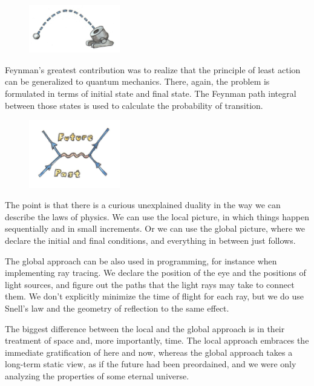 \begin{figure}[H]
\centering
\includegraphics[width=1.56250in]{images/mortar.jpg}
\end{figure}

\noindent
Feynman's greatest contribution was to realize that the principle of
least action can be generalized to quantum mechanics. There, again, the
problem is formulated in terms of initial state and final state. The
Feynman path integral between those states is used to calculate the
probability of transition.

\begin{figure}[H]
\centering
\includegraphics[width=1.56250in]{images/feynman.jpg}
\end{figure}

\noindent
The point is that there is a curious unexplained duality in the way we
can describe the laws of physics. We can use the local picture, in which
things happen sequentially and in small increments. Or we can use the
global picture, where we declare the initial and final conditions, and
everything in between just follows.

The global approach can be also used in programming, for instance when
implementing ray tracing. We declare the position of the eye and the
positions of light sources, and figure out the paths that the light rays
may take to connect them. We don't explicitly minimize the time of
flight for each ray, but we do use Snell's law and the geometry of
reflection to the same effect.

The biggest difference between the local and the global approach is in
their treatment of space and, more importantly, time. The local approach
embraces the immediate gratification of here and now, whereas the global
approach takes a long-term static view, as if the future had been
preordained, and we were only analyzing the properties of some eternal
universe.

